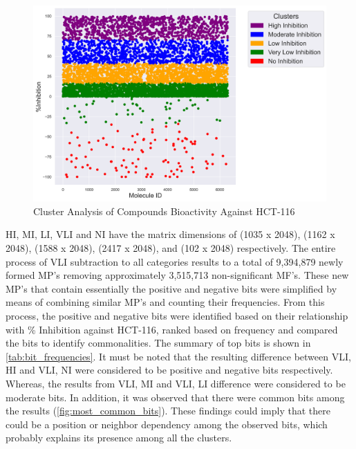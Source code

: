 \begin{figure}[h] %
    \centering
    \includegraphics[scale=0.6]{cluster.png} %
    \caption{Cluster Analysis of Compounds Bioactivity Against HCT-116}
    \label{fig:cluster} %
\end{figure}

HI, MI, LI, VLI and NI have the matrix dimensions of (1035 x 2048), (1162 x 2048), (1588 x 2048), (2417 x 2048), and (102 x 2048) respectively. The entire process of VLI subtraction to all categories results to a total of 9,394,879 newly formed MP's removing approximately 3,515,713 non-significant MF's. These new MP's that contain essentially the positive and negative bits were simplified by means of combining similar MP's and counting their frequencies. From this process, the positive and negative bits were identified based on their relationship with \% Inhibition against HCT-116, ranked based on frequency and compared the bits to identify commonalities. The summary of top bits is shown in \autoref{tab:bit_frequencies}. It must be noted that the resulting difference between VLI, HI and VLI, NI were considered to be positive and negative bits respectively. Whereas, the results from VLI, MI and VLI, LI difference were considered to be moderate bits. In addition, it was observed that there were common bits among the results (\autoref{fig:most_common_bits}). These findings could imply that there could be a position or neighbor dependency among the observed bits, which probably explains its presence among all the clusters.





